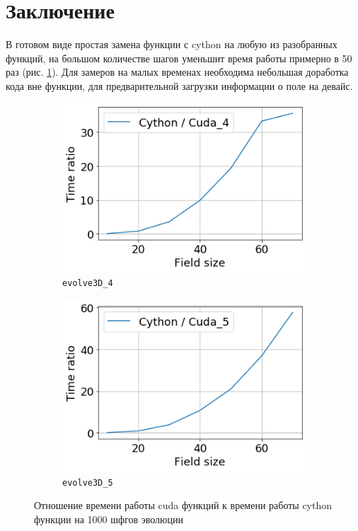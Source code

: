 \documentclass[a4paper,12pt]{article}
\begin{document}
\section{Заключение}
В готовом виде простая замена функции с cython на любую из разобранных функций, на большом количестве шагов уменьшит время работы примерно в 50 раз (рис. \ref{fig:cython_ratio}). Для замеров на малых временах необходима небольшая доработка кода вне функции, для предварительной загрузки информации о поле на девайс.

\begin{figure}[htb]
	\centering
	\begin{subfigure}[b]{0.45\textwidth}
		\includegraphics[width = \textwidth]{Images/Cython_to_cuda4_on_1000_step.png} 
		\caption{\texttt{evolve3D\_4}}
	\end{subfigure}
	\hfill
	\begin{subfigure}[b]{0.45\textwidth}
		\includegraphics[width = \textwidth]{Images/Cython_to_Cuda5_on_1000_step.png}
		\caption{\texttt{evolve3D\_5}} 
	\end{subfigure}
	\caption{Отношение времени работы cuda функций к времени работы cython функции на 1000 шфгов эволюции}
	\label{fig:cython_ratio}
\end{figure}
\end{document}
